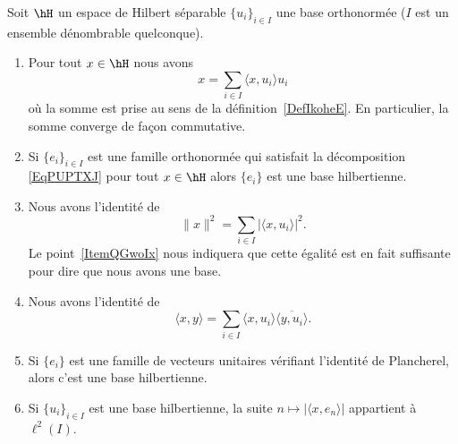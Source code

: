 \begin{theorem}     \label{ThoyAjoqP}
    Soit \( \hH\) un espace de Hilbert séparable \( \{ u_i \}_{i\in I}\) une base orthonormée (\( I\) est un ensemble dénombrable quelconque).

    \begin{enumerate}
        \item \label{ItemQGwoIxi}
            Pour tout \( x\in \hH\) nous avons
            \begin{equation}        \label{EqPUPTXJ}
                x=\sum_{i\in I}\langle x, u_i\rangle u_i
            \end{equation}
            où la somme est prise au sens de la définition~\ref{DefIkoheE}. En particulier, la somme converge de façon commutative.

        \item

            Si \( \{ e_i \}_{i\in I}\) est une famille orthonormée qui satisfait la décomposition \eqref{EqPUPTXJ} pour tout \( x\in \hH\) alors \( \{ e_i \}\) est une base hilbertienne.
        \item
            Nous avons l'identité de 
            \begin{equation}
                \| x \|^2=\sum_{i\in I}| \langle x, u_i\rangle  |^2.
            \end{equation}
            Le point~\ref{ItemQGwoIx} nous indiquera que cette égalité est en fait suffisante pour dire que nous avons une base.
        \item
            Nous avons l'identité de 
            \begin{equation}    \label{EqHZxjtKt}
                \langle x, y\rangle =\sum_{i\in I}\langle x, u_i\rangle \overline{ \langle y, u_i\rangle  }.
            \end{equation}
        \item   \label{ItemQGwoIx}
            Si \( \{ e_i \}\) est une famille de vecteurs unitaires vérifiant l'identité de Plancherel, alors c'est une base hilbertienne.
        \item
            Si \( \{ u_i \}_{i\in I}\) est une base hilbertienne, la suite \( n\mapsto| \langle x, e_n\rangle  |\) appartient à \( \ell^2(I)\).
    \end{enumerate}
\end{theorem}

